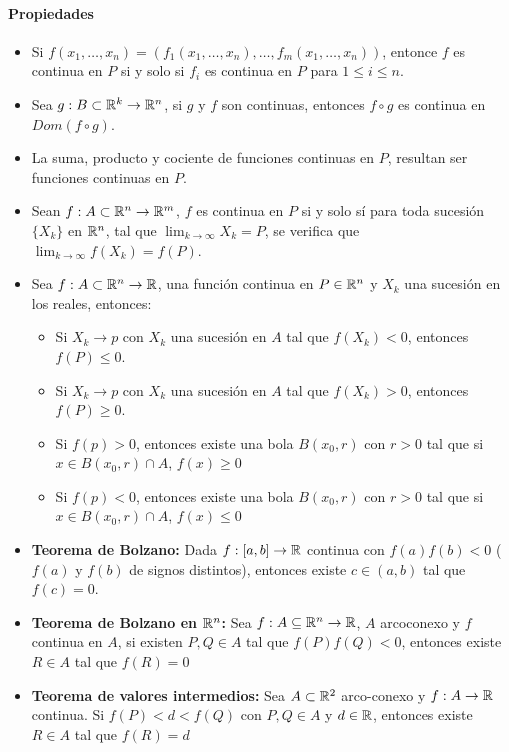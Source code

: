 \paragraph{Propiedades}
\begin{itemize}
\item Si $f(x_1,\dots,x_n) = (f_1(x_1,\dots,x_n),\dots, f_m(x_1,\dots,x_n))$, entonce $f$ es continua en $P$ si y solo si $f_i$ es continua en $P$ para $1\leq i\leq n$.
\item Sea $g : B\subset\mathbb{R}^k\rightarrow \mathbb{R}^n$, si $g$ y $f$ son continuas, entonces $f\circ g$ es continua en $Dom(f\circ g)$.
\item La suma, producto y cociente de funciones continuas en $P$, resultan ser funciones continuas en $P$.



\item Sean $f : A\subset\mathbb{R}^n\rightarrow \mathbb{R}^m$, $f$ es continua en $P$ si y solo sí para toda sucesión $\{X_k\}$ en $\mathbb{R}^n$, tal que $\lim_{k\to\infty} X_k = P$, se verifica que $\lim_{k\to\infty} f(X_k) = f(P)$.


\item Sea $f : A\subset\mathbb{R}^n\rightarrow \mathbb{R}$, una función continua en $P\in\mathbb{R}^n$ y $X_k$ una sucesión en los reales, entonces:
\begin{itemize}
\item Si $X_k\to p$ con $X_k$ una sucesión en $A$ tal que $f(X_k) < 0$, entonces $f(P)\leq 0$.
\item Si $X_k\to p$ con $X_k$ una sucesión en $A$ tal que $f(X_k) > 0$, entonces $f(P)\geq 0$.
\item Si $f(p) > 0$, entonces existe una bola $B(x_0, r)$ con $r>0$ tal que si $x\in B(x_0,r)\cap A$, $f(x) \geq 0$
\item Si $f(p) <  0$, entonces existe una bola $B(x_0, r)$ con $r>0$ tal que si $x\in B(x_0,r)\cap A$, $f(x) \leq 0$
\end{itemize}
\item \textbf{Teorema de Bolzano:} Dada $f:[a,b]\to\mathbb{R}$ continua con $f(a)f(b) < 0$ ($f(a)$ y $f(b)$ de signos distintos), entonces
existe $c\in(a,b)$ tal que $f(c) = 0$.

\item \textbf{Teorema de Bolzano en $\mathbb{R}^n$:} Sea $f:A\subseteq\mathbb{R}^n\to\mathbb{R}$, $A$ arcoconexo y $f$ continua en $A$, si existen $P,Q\in A$ tal que $f(P)f(Q) < 0$, entonces existe $R\in A$ tal que $f(R) = 0$

\item \textbf{Teorema de valores intermedios: } Sea $A\subset\mathbb{R}^2$ arco-conexo y $f:A\to\mathbb{R}$ continua. Si $f(P) < d < f(Q)$ con $P,Q\in A$ y $d\in\mathbb{R}$, entonces existe $R\in A$ tal que $f(R) = d$
\end{itemize}


